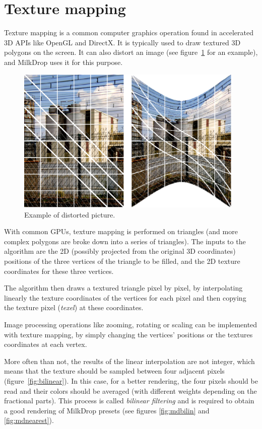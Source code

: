 \documentclass[a4paper,11pt]{kthesis}
\begin{document}
\section{Texture mapping}
\label{sec:tm}
Texture mapping is a common computer graphics operation found in accelerated 3D APIs like OpenGL and DirectX. It is typically used to draw textured 3D polygons on the screen. It can also distort an image (see figure~\ref{fig:distorted} for an example), and MilkDrop uses it for this purpose.

\begin{figure}
\centering
\includegraphics[height=70mm]{tesselsanofi.eps}
\caption{Example of distorted picture.}
\label{fig:distorted}
\end{figure}

With common GPUs, texture mapping is performed on triangles (and more complex polygons are broke down into a series of triangles). The inputs to the algorithm are the 2D (possibly projected from the original 3D coordinates) positions of the three vertices of the triangle to be filled, and the 2D texture coordinates for these three vertices.

The algorithm then draws a textured triangle pixel by pixel, by interpolating linearly the texture coordinates of the vertices for each pixel and then copying the texture pixel (\textit{texel}) at these coordinates.

Image processing operations like zooming, rotating or scaling can be implemented with texture mapping, by simply changing the vertices' positions or the textures coordinates at each vertex.

More often than not, the results of the linear interpolation are not integer, which means that the texture should be sampled between four adjacent pixels (figure~\ref{fig:bilinear}). In this case, for a better rendering, the four pixels should be read and their colors should be averaged (with different weights depending on the fractional parts). This process is called \textit{bilinear filtering} and is required to obtain a good rendering of MilkDrop presets (see figures \ref{fig:mdbilin} and \ref{fig:mdnearest}).
\end{document}
